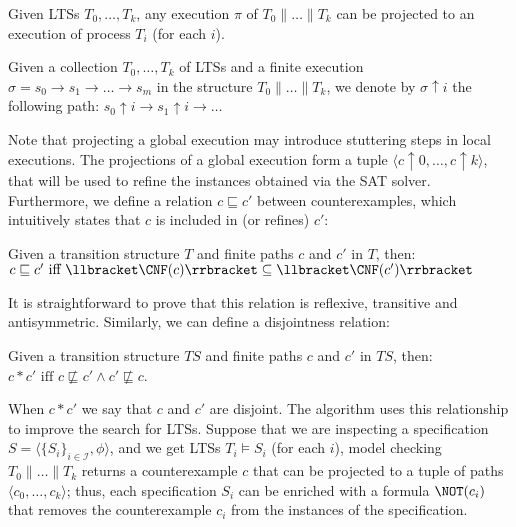 Given LTSs $T_0, \dots, T_k$, any execution $\pi$ of $T_0 \parallel \dots \parallel T_k$ can be projected to an execution of process $T_i$ (for each $i$).	
\begin{definition} Given a collection $T_0,\dots,T_k$ of LTSs and a finite execution $\sigma = s_0\rightarrow s_1\rightarrow \dots \rightarrow s_m$ in the structure $T_0 \parallel \dots \parallel T_k$, we denote by $\sigma {\uparrow} i$ the following path:
$
s_0 {\uparrow} i \rightarrow s_1 {\uparrow} i \rightarrow \dots
$
\end{definition}
Note that projecting  a global execution may introduce stuttering steps in local executions. The projections of a global execution form a tuple  $\langle c{\uparrow}0, \dots,  c{\uparrow}k \rangle$, that will be used to  refine the instances obtained via the SAT solver. Furthermore,  we define a relation $c \sqsubseteq c'$ between counterexamples, which intuitively states that  $c$ is included in (or refines) $c'$:
\begin{definition}\label{def:cex-ref} Given a transition structure $T$ and finite paths $c$ and $c'$ in $T$, then:
$
	c \sqsubseteq c' \mbox{ iff } \llbracket \CNF(c) \rrbracket \subseteq \llbracket \CNF(c') \rrbracket
$
\end{definition}
It is straightforward to prove that this relation is reflexive, transitive and antisymmetric.
Similarly, we can define a disjointness relation:
\begin{definition} Given a transition structure $TS$ and finite paths $c$ and $c'$ in $TS$, then:
	 $c * c' \mbox{ iff } c \not\sqsubseteq c' \wedge c' \not\sqsubseteq c$.
\end{definition}
When $c * c'$ we say that $c$ and $c'$ are disjoint. The algorithm uses this relationship to improve the search for LTSs. Suppose that we are inspecting a specification $S = \langle \{S_i\}_{i \in \mathcal{I}}, \phi \rangle$, and we get LTSs $T_i \vDash S_i$ (for each $i$),  model checking  $T_0 \parallel \dots \parallel T_k$ returns a counterexample $c$ that can be projected to a tuple of paths $\langle c_0, \dots, c_k \rangle$; thus, each specification $S_i$ can be enriched with a formula $\NOT(c_i)$ that removes the counterexample $c_i$ from the instances of the specification.
